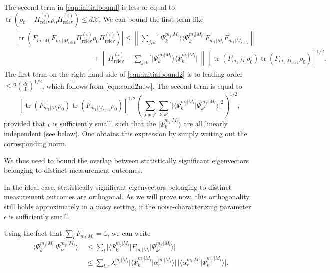The second term in \ref{eqn:initialbound} is less or equal to $\operatorname{tr}\left(\rho_0-\Pi_{\text{relev}}^{(i)}\rho_0\Pi_{\text{relev}}^{(i)}\right)\leq d\mathcal{X}$. We can bound the first term like
\begin{align}
\label{eqn:initialbound2}
\begin{split}
& \left| \operatorname{tr}\left(F_{m_1\vert M_i} F_{m_1\vert M_{i \oplus 1}}\Pi_{\text{relev}}^{(i)}\rho_0\Pi_{\text{relev}}^{(i)}\right)\right| \leq  \left\|\sum_{j,k} {}^{'} \vert \Psi_k^{m_j\vert M_i}\rangle \langle \Psi_k^{m_j\vert M_i} \vert F_{m_1\vert M_i} F_{m_1 \vert M_{i\oplus 1}}\right\| \\
& \hspace{11em} + \left\|\Pi_{\text{relev}}^{(i)} - \sum_{j,k} {}^{'} \vert \Psi_k^{m_j\vert M_i}\rangle \langle \Psi_k^{m_j\vert M_i} \vert \, \right\| \,\left[ \operatorname{tr}(F_{m_1\vert M_i}\rho_0)\operatorname{tr}(F_{m_1\vert M_{i\oplus 1}}\rho_0)\right]^{1/2}.
\end{split}
\end{align}
The first term on the right hand side of \ref{eqn:initialbound2} is to leading order $\leq 2\left(\frac{d\epsilon}{\mathcal{X}}\right)^{1/2}$, which follows from \ref{eqn:cond2new}. The second term is equal to
\begin{equation}
\label{eqn:tobound}
\left[\operatorname{tr}(F_{m_1\vert M_i}\rho_0)\operatorname{tr}(F_{m_1\vert M_{i\oplus 1}}\rho_0)\right]^{1/2}\left(\,\sum_{j\neq j'}\sum_{k,k'}{}^{'}\vert \langle \Psi_k^{m_j\vert M_i}\vert \Psi_{k'}^{m_{j'}\vert M_i} \rangle \vert^2\right)^{1/2},
\end{equation}
provided that $\epsilon$ is sufficiently small, such that the $\vert \Psi_k^{m_j \vert M_i}\rangle$ are all linearly independent (see below). One obtains this expression by simply writing out the corresponding norm.

We thus need to bound the overlap between statistically significant eigenvectors belonging to distinct measurement outcomes.

In the ideal case, statistically significant eigenvectors belonging to distinct measurement outcomes are orthogonal. As we will prove now, this orthogonality still holds approximately in a noisy setting, if the noise-characterizing parameter $\epsilon$ is sufficiently small.

Using the fact that $\sum_{l} F_{m_{l}\vert M_i}=\mathbb{1}$, we can write
\begin{align}
\vert\langle \Psi_k^{m_j\vert M_i} \vert \Psi_{k'}^{m_{j'}\vert M_i}\rangle \vert & \leq \sum_l \vert \langle \Psi_k^{m_j\vert M_i} \vert F_{m_l\vert M_i}\vert \Psi_{k'}^{m_{j'}\vert M_i}\rangle\vert \\
\label{eqn:toinsert}
& \leq \sum_{l,r}\lambda_r^{m_l\vert M_i}\vert \langle \Psi_k^{m_j\vert M_i} \vert \alpha_r^{m_l\vert M_i}\rangle \vert \, \vert \langle \alpha_r^{m_l\vert M_i}\vert \Psi_{k'}^{m_{j'}\vert M_i}\rangle \vert.
\end{align}

